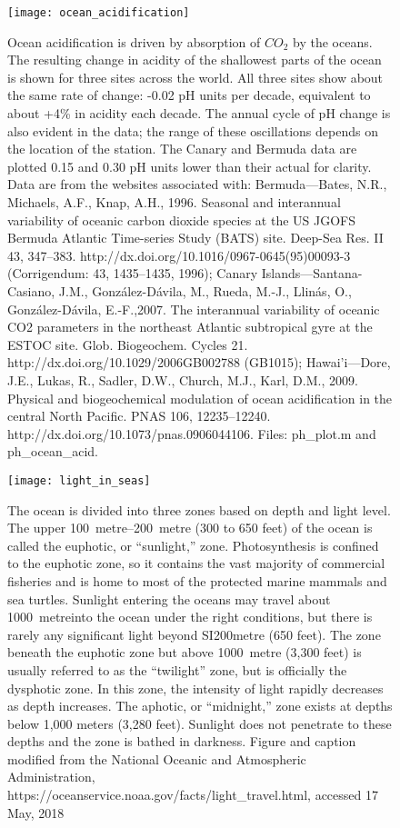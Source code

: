 \documentclass[amstex,12pt]{book}
\begin{document}
{\newpage
\begin{figure}[p]
\centering
  \texttt{[image: ocean\_acidification]}%
\caption{Ocean acidification is driven by absorption of $CO_2$ by the oceans. The resulting change in acidity of the shallowest parts of the ocean is shown for three sites across the world. All three sites show about the same rate of change: -0.02 pH units per decade, equivalent to about +4\% in acidity each decade. The annual cycle of pH change is also evident in the data; the range of these oscillations depends on the location of the station. The Canary and Bermuda data are plotted 0.15 and 0.30 pH units lower than their actual for clarity. Data are from the websites associated with: Bermuda---Bates, N.R., Michaels, A.F., Knap, A.H., 1996. Seasonal and interannual variability of oceanic carbon dioxide species at the US JGOFS Bermuda Atlantic Time-series Study (BATS) site. Deep-Sea Res. II 43, 347–383. http://dx.doi.org/10.1016/0967-0645(95)00093-3 (Corrigendum: 43, 1435–1435, 1996); Canary Islands---Santana-Casiano, J.M., González-Dávila, M., Rueda, M.-J., Llinás, O., González-Dávila, E.-F.,2007. The interannual variability of oceanic CO2 parameters in the northeast Atlantic subtropical gyre at the ESTOC site. Glob. Biogeochem. Cycles 21. http://dx.doi.org/10.1029/2006GB002788 (GB1015); Hawai'i---Dore, J.E., Lukas, R., Sadler, D.W., Church, M.J., Karl, D.M., 2009. Physical and biogeochemical modulation of ocean acidification in the central North Pacific. PNAS 106, 12235–12240. http://dx.doi.org/10.1073/pnas.0906044106. Files: ph\_plot.m and ph\_ocean\_acid.
}
\label{fig:oa}
\end{figure}

\newpage
\begin{figure}[p]
\centering
  \texttt{[image: light\_in\_seas]}%
\caption{The ocean is divided into three zones based on depth and light level. The upper \SIrange{100}{200}{metre} (300 to 650 feet) of the ocean is called the euphotic, or ``sunlight,'' zone. Photosynthesis is confined to the euphotic zone, so it contains the vast majority of commercial fisheries and is home to most of the protected marine mammals and sea turtles. Sunlight entering the oceans may travel about \SI{1000}{metre}into the ocean under the right conditions, but there is rarely any significant light beyond SI{200}{metre} (650 feet). The zone beneath the euphotic zone but above \SI{1000}{metre} (3,300 feet) is usually referred to as the ``twilight'' zone, but is officially the dysphotic zone. In this zone, the intensity of light rapidly decreases as depth increases. The aphotic, or ``midnight,'' zone exists at depths below 1,000 meters (3,280 feet). Sunlight does not penetrate to these depths and the zone is bathed in darkness. Figure and caption modified from the National Oceanic and Atmospheric Administration, https://oceanservice.noaa.gov/facts/light\_travel.html, accessed 17 May, 2018}
\label{fig:light_in_seas}
\end{figure}

}
\end{document}
